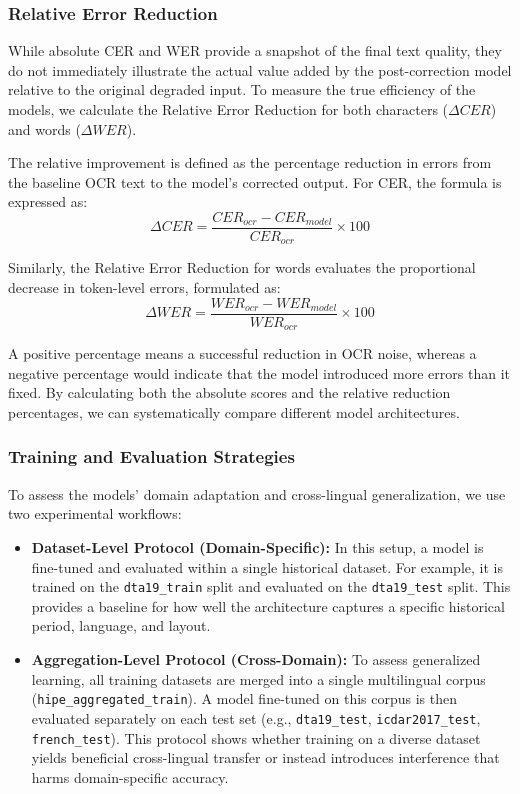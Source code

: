 \documentclass[11pt]{extarticle}
\begin{document}
\subsubsection{Relative Error Reduction}
While absolute CER and WER provide a snapshot of the final text quality, they do not immediately illustrate the actual value added by the post-correction model relative to the original degraded input. To measure the true efficiency of the models, we calculate the Relative Error Reduction for both characters ($\Delta CER$) and words ($\Delta WER$).

The relative improvement is defined as the percentage reduction in errors from the baseline OCR text to the model's corrected output. For CER, the formula is expressed as:
\begin{equation}
    \Delta CER = \frac{CER_{ocr} - CER_{model}}{CER_{ocr}} \times 100
\end{equation}

Similarly, the Relative Error Reduction for words evaluates the proportional decrease in token-level errors, formulated as:
\begin{equation}
    \Delta WER = \frac{WER_{ocr} - WER_{model}}{WER_{ocr}} \times 100
\end{equation}

A positive percentage means a successful reduction in OCR noise, whereas a negative percentage would indicate that the model introduced more errors than it fixed. By calculating both the absolute scores and the relative reduction percentages, we can systematically compare different model architectures.

\subsubsection{Training and Evaluation Strategies}
To assess the models' domain adaptation and cross-lingual generalization, we use two experimental workflows:

\begin{itemize}
    \item \textbf{Dataset-Level Protocol (Domain-Specific):} In this setup, a model is fine-tuned and evaluated within a single historical dataset. For example, it is trained on the \texttt{dta19\_train} split and evaluated on the \texttt{dta19\_test} split. This provides a baseline for how well the architecture captures a specific historical period, language, and layout.
    
    \item \textbf{Aggregation-Level Protocol (Cross-Domain):} To assess generalized learning, all training datasets are merged into a single multilingual corpus (\texttt{hipe\_aggregated\_train}). A model fine-tuned on this corpus is then evaluated separately on each test set (e.g., \texttt{dta19\_test}, \texttt{icdar2017\_test}, \texttt{french\_test}). This protocol shows whether training on a diverse dataset yields beneficial cross-lingual transfer or instead introduces interference that harms domain-specific accuracy.
\end{itemize}
\end{document}
